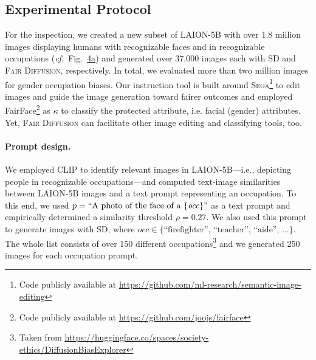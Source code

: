 \documentclass{article}%
\newcommand{\cf}{\emph{cf.}~}
\begin{document}
\subsection*{Experimental Protocol}
For the inspection, we created a new subset of LAION-5B with over 1.8 million images displaying humans with recognizable faces and in recognizable occupations (\cf Fig.~\hyperref[fig:dataset-stats]{4a}) and generated over 37,000 images each with SD and %
\textsc{Fair Diffusion}, respectively. In total, we evaluated more than two million images for gender occupation biases.
Our instruction tool is built around \textsc{Sega}\footnote{Code publicly available at \url{https://github.com/ml-research/semantic-image-editing}} to edit images and guide the image generation toward fairer outcomes and employed FairFace\footnote{Code publicly available at \url{https://github.com/joojs/fairface}} \cite{fairface} as $\kappa$ to classify the protected attribute, i.e. facial (gender) attributes. Yet, \textsc{Fair Diffusion} can facilitate other image editing and classifying tools, too.


\paragraph{Prompt design.} We employed CLIP to identify relevant images in LAION-5B---i.e., depicting people in recognizable occupations---and computed text-image similarities between LAION-5B images and a text prompt representing an occupation. To this end, we used $p=\text{``A photo of the face of a \{\textit{occ}\}''}$ as a text prompt and empirically determined a similarity threshold $\rho=0.27$. We also used this prompt to generate images with SD, where \mbox{$\textit{occ}\in \{\text{``firefighter'', ``teacher'', ``aide'', ...}\}$}. The whole list consists of over 150 different occupations\footnote{Taken from \url{https://huggingface.co/spaces/society-ethics/DiffusionBiasExplorer}} and we generated 250 images for each occupation prompt.
\end{document}
